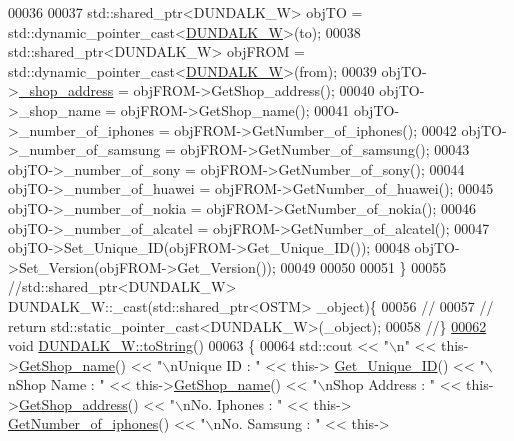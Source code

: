 \begin{DoxyCode}
00036 
00037     std::shared\_ptr<DUNDALK\_W> objTO = std::dynamic\_pointer\_cast<\hyperlink{class_d_u_n_d_a_l_k___w}{DUNDALK\_W}>(to);
00038     std::shared\_ptr<DUNDALK\_W> objFROM = std::dynamic\_pointer\_cast<\hyperlink{class_d_u_n_d_a_l_k___w}{DUNDALK\_W}>(from);
00039     objTO->\hyperlink{class_d_u_n_d_a_l_k___w_a84ef96f22ec520afc66bb26b0d264475_a84ef96f22ec520afc66bb26b0d264475}{\_shop\_address} = objFROM->GetShop\_address();
00040     objTO->\_shop\_name = objFROM->GetShop\_name();
00041     objTO->\_number\_of\_iphones = objFROM->GetNumber\_of\_iphones();
00042     objTO->\_number\_of\_samsung = objFROM->GetNumber\_of\_samsung();
00043     objTO->\_number\_of\_sony = objFROM->GetNumber\_of\_sony();
00044     objTO->\_number\_of\_huawei = objFROM->GetNumber\_of\_huawei();
00045     objTO->\_number\_of\_nokia = objFROM->GetNumber\_of\_nokia();
00046     objTO->\_number\_of\_alcatel = objFROM->GetNumber\_of\_alcatel();
00047     objTO->Set\_Unique\_ID(objFROM->Get\_Unique\_ID());
00048     objTO->Set\_Version(objFROM->Get\_Version());
00049     
00050    
00051 \}
00055 \textcolor{comment}{//std::shared\_ptr<DUNDALK\_W> DUNDALK\_W::\_cast(std::shared\_ptr<OSTM> \_object)\{}
00056 \textcolor{comment}{//    }
00057 \textcolor{comment}{//    return std::static\_pointer\_cast<DUNDALK\_W>(\_object);}
00058 \textcolor{comment}{//\}}
\hypertarget{_d_u_n_d_a_l_k___w_8cpp_source.tex_l00062}{}\hyperlink{class_d_u_n_d_a_l_k___w_aef2a8301835c60c21f9f3199259fed87_aef2a8301835c60c21f9f3199259fed87}{00062} \textcolor{comment}{}\textcolor{keywordtype}{void} \hyperlink{class_d_u_n_d_a_l_k___w_aef2a8301835c60c21f9f3199259fed87_aef2a8301835c60c21f9f3199259fed87}{DUNDALK\_W::toString}()
00063 \{
00064    std::cout << \textcolor{stringliteral}{"\(\backslash\)n"} <<  this->\hyperlink{class_d_u_n_d_a_l_k___w_a1b0a9008ea26cf2181eca0dfb93acc9f_a1b0a9008ea26cf2181eca0dfb93acc9f}{GetShop\_name}() << \textcolor{stringliteral}{"\(\backslash\)nUnique ID : "} << this->
      \hyperlink{class_o_s_t_m_a5a01a8b98d16b1d1904ecf9356e7b71d_a5a01a8b98d16b1d1904ecf9356e7b71d}{Get\_Unique\_ID}() << \textcolor{stringliteral}{"\(\backslash\)nShop Name : "}  << this->\hyperlink{class_d_u_n_d_a_l_k___w_a1b0a9008ea26cf2181eca0dfb93acc9f_a1b0a9008ea26cf2181eca0dfb93acc9f}{GetShop\_name}() << \textcolor{stringliteral}{"\(\backslash\)nShop Address : 
      "} << this->\hyperlink{class_d_u_n_d_a_l_k___w_af9c0a573ae5d8b388a46652621224002_af9c0a573ae5d8b388a46652621224002}{GetShop\_address}() << \textcolor{stringliteral}{"\(\backslash\)nNo. Iphones : "} << this->
      \hyperlink{class_d_u_n_d_a_l_k___w_a8fe67b0cea3e113beaf88917768fafc9_a8fe67b0cea3e113beaf88917768fafc9}{GetNumber\_of\_iphones}() << \textcolor{stringliteral}{"\(\backslash\)nNo. Samsung : "} << this->

\end{DoxyCode}
